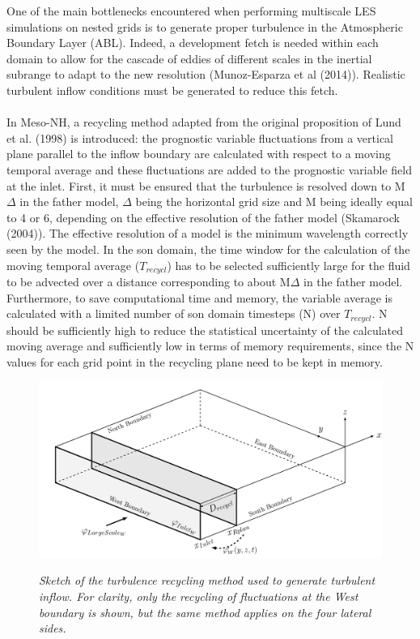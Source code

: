One of the main bottlenecks encountered when performing multiscale LES simulations on nested grids is to generate proper turbulence in the Atmospheric Boundary Layer (ABL). Indeed, a development fetch is needed within each domain to allow for the cascade of eddies of different scales in the inertial subrange to adapt to the new resolution (Munoz-Esparza et al (2014)). Realistic turbulent inflow conditions must be generated to reduce this fetch. 
\\
\\ In Meso-NH, a recycling method adapted from the original proposition of Lund et al. (1998) is introduced: the prognostic variable fluctuations from a vertical plane parallel to the inflow boundary are calculated with respect to a moving temporal average and these fluctuations are added to the prognostic variable field at the inlet. First, it must be ensured that the turbulence is resolved down to M$\Delta$ in the father model, $\Delta$ being the horizontal grid size and M being ideally equal to 4 or 6, depending on the effective resolution of the father model (Skamarock (2004)). The effective resolution of a model is the minimum wavelength correctly seen by the model. In the son domain, the time window for the calculation of the moving temporal average ($T_{recycl}$) has to be selected sufficiently large for the fluid to be advected over a distance corresponding to about M$\Delta$ in the father model. Furthermore, to save computational time and memory, the variable average is calculated with a limited number of son domain timesteps (N) over $T_{recycl}$. N should be sufficiently high to reduce the statistical uncertainty of the calculated moving average and sufficiently low in terms of memory requirements, since the N values for each grid point in the recycling plane need to be kept in memory.

\begin{figure}[!ht]
\begin{center}
 {\includegraphics[width=1.\textwidth]{EPS/recycl3D_sketch.png}}
\caption{\label{recycling_sketch}\footnotesize \textit{Sketch of the turbulence recycling method used to generate turbulent inflow. For clarity, only the recycling of fluctuations at the West boundary is shown, but the same method applies on the four lateral sides.}}
\end{center}
\end{figure}

